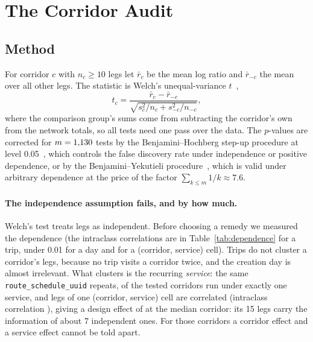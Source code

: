 \section{The Corridor Audit}\label{sec:audit}

\subsection{Method}
For corridor $c$ with $n_c\ge 10$ legs let $\bar r_c$ be the mean log ratio and $\bar r_{-c}$ the mean over all other legs. The statistic is Welch's unequal-variance $t$~\cite{welch1947generalization},
\begin{equation}
t_c=\frac{\bar r_c-\bar r_{-c}}{\sqrt{s_c^2/n_c+s_{-c}^2/n_{-c}}},
\end{equation}
where the comparison group's sums come from subtracting the corridor's own from the network totals, so all \fzCorridorsTested{} tests need one pass over the data. The $p$-values are corrected for $m=1{,}130{}$ tests by the Benjamini--Hochberg step-up procedure at level 0.05~\cite{benjamini1995controlling}, which controls the false discovery rate under independence or positive dependence, or by the Benjamini--Yekutieli procedure~\cite{benjamini2001control}, which is valid under arbitrary dependence at the price of the factor $\sum_{k\le m}1/k\approx 7.6$.

\paragraph{The independence assumption fails, and by how much.} Welch's test treats legs as independent. Before choosing a remedy we measured the dependence (the intraclass correlations are \ifjournal in Table~\ref{tab:dependence} for a trip, under 0.01 for a day and \fzDepIccServiceCellDpTwo{} for a (corridor, service) cell\fi). Trips do not cluster a corridor's legs, because no trip visits a corridor twice, and the creation day is almost irrelevant. What clusters is the recurring \emph{service}: the same \texttt{route\_schedule\_uuid} repeats, \fzDepSingleServiceCorridors{} of the \fzCorridorsTested{} tested corridors run under exactly one service, and legs of one (corridor, service) cell are correlated (intraclass correlation \fzDepIccServiceCellDpTwo{}), giving a design effect of \fzDepDesignEffectMedianDpTwo{} at the median corridor: its 15 legs carry the information of about 7 independent ones. For those corridors a corridor effect and a service effect cannot be told apart.

